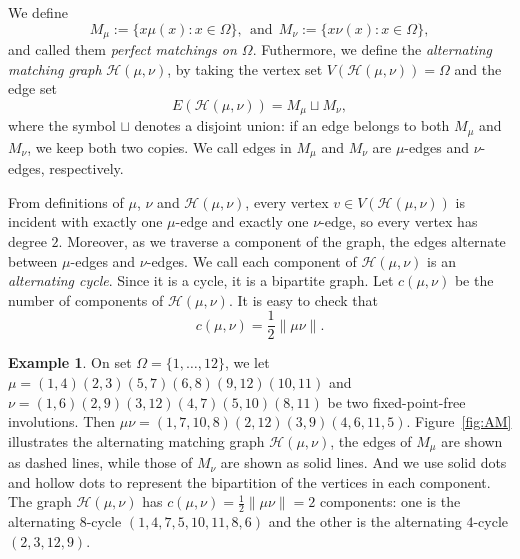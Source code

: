 \documentclass[12pt]{article}
\theoremstyle{definition}
\newtheorem{example}[theorem]{Example}
\begin{document}
We define
\[
M_\mu := \{ x\mu(x) : x \in \Omega \}, ~~\mbox{and}~~M_\nu := \{ x\nu(x) : x \in \Omega \},
\]
and called them {\it perfect matchings on $\Omega$}. Futhermore, we define the {\it alternating matching graph} $\mathcal H(\mu,\nu)$, by taking the vertex set $V(\mathcal H(\mu,\nu))=\Omega$ and the edge set
\[
E(\mathcal H(\mu,\nu)) = M_\mu \sqcup M_\nu,
\]
where the symbol $\sqcup$ denotes a disjoint union: if an edge belongs to both $M_\mu$ and $M_\nu$, we keep both two copies.  We call edges in $M_\mu$ and $M_\nu$ are $\mu$-edges and $\nu$-edges, respectively.

From definitions of $\mu$, $\nu$ and $\mathcal H(\mu,\nu)$,  every vertex $v\in V(\mathcal H(\mu,\nu))$ is incident with exactly one $\mu$-edge and exactly one $\nu$-edge, so every vertex has degree $2$. Moreover, as we traverse a component of the graph, the edges alternate between $\mu$-edges and $\nu$-edges. We call each component of
$\mathcal H(\mu,\nu)$ is an {\it alternating cycle}. Since it is a cycle, it is a bipartite graph. Let $c(\mu,\nu)$ be the number of components of $\mathcal H(\mu,\nu)$.
It is easy to check that
\[
c(\mu,\nu)=\frac12 \|\mu\nu\|.
\]

\begin{example}
On set $\Omega=\{1,\ldots, 12\}$, we let $\mu=(1,4)(2,3)(5,7)(6,8)(9,12)(10,11)$ and $\nu=(1,6)(2,9)(3,12)(4,7)(5,10)(8,11)$ be two fixed-point-free involutions. Then $\mu\nu=(1,7,10,8)(2,12)(3,9)(4,6,11,5)$.
Figure~\ref{fig:AM} illustrates the alternating matching graph $\mathcal H(\mu,\nu)$, the edges of $M_\mu$ are shown as dashed lines, while those of $M_{\nu}$ are shown as  solid lines. And we use solid dots and hollow dots to represent the bipartition of the vertices in each component. The graph $\mathcal H(\mu,\nu)$ has
$c(\mu,\nu)=\frac12\lVert\mu\nu\rVert=2$ components: one is the alternating $8$-cycle $(1,4,7,5,10,11,8,6)$ and the other is the alternating $4$-cycle $(2,3,12,9)$.
\end{example}
\end{document}
